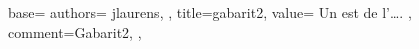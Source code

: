 {
  base={
    authors={
      jlaurens,
    },
    title=gabarit2,
    value={
      Un  est  de l'….
    },
    comment={Gabarit2},
  },
}
